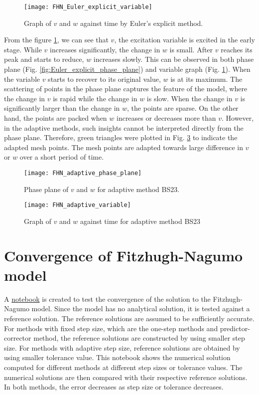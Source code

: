 \begin{figure}
    \texttt{[image: FHN\_Euler\_explicit\_variable]}
    \caption{Graph of $v$ and $w$ against time by Euler's explicit method.}
    \label{fig:Euler_explicit_variable}
\end{figure}


From the figure \ref{fig:Euler_explicit_variable}, we can see that $v$, the excitation variable is excited in the early stage. While $v$ increases significantly, the change in $w$ is small. After $v$ reaches its peak and starts to reduce, $w$ increases slowly. This can be observed in both phase plane (Fig. \ref{fig:Euler_explicit_phase_plane}) and variable graph (Fig. \ref{fig:Euler_explicit_variable}). When the variable $v$ starts to recover to its original value, $w$ is at its maximum. The scattering of points in the phase plane captures the feature of the model, where the change in $v$ is rapid while the change in $w$ is slow. When the change in $v$ is significantly larger than the change in $w$, the points are sparse. On the other hand, the points are packed when $w$ increases or decreases more than $v$. However, in the adaptive methods, such insights cannot be interpreted directly from the phase plane. Therefore, green triangles were plotted in Fig. \ref{fig:adaptive_variable} to indicate the adapted mesh points. The mesh points are adapted towards large difference in $v$ or $w$ over a short period of time.

\begin{figure}
    \texttt{[image: FHN\_adaptive\_phase\_plane]}
    \caption{Phase plane of $v$ and $w$ for adaptive method BS23.}
    \label{fig:adaptive_phase_plane}
\end{figure}

\begin{figure}
    \texttt{[image: FHN\_adaptive\_variable]}
    \caption{Graph of $v$ and $w$ against time for adaptive method BS23}
    \label{fig:adaptive_variable}
\end{figure}

\section{Convergence of Fitzhugh-Nagumo model}
\label{sec:FHN-convergence}
A \href{https://nbviewer.jupyter.org/github/FarmHJ/numerical-solver/blob/main/examples/fhn_model_convergence.ipynb}{notebook} is created to test the convergence of the solution to the Fitzhugh-Nagumo model. Since the model has no analytical solution, it is tested against a reference solution. The reference solutions are assumed to be sufficiently accurate. For methods with fixed step size, which are the one-step methods and predictor-corrector method, the reference solutions are constructed by using smaller step size. For methods with adaptive step size, reference solutions are obtained by using smaller tolerance value. This notebook shows the numerical solution computed for different methods at different step sizes or tolerance values. The numerical solutions are then compared with their respective reference solutions. In both methods, the error decreases as step size or tolerance decreases.

